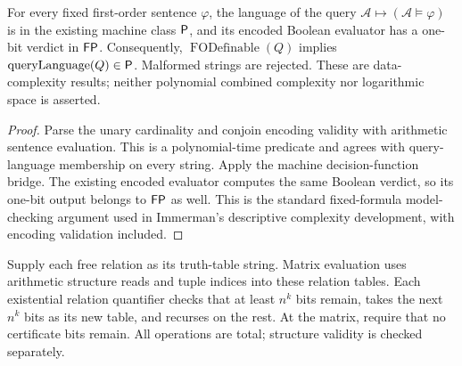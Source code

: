 \begin{theorem}
  \label{thm:desc-fo-in-P}
  \leanok
  For every fixed first-order sentence $\varphi$, the language of the query
  $\mathcal{A} \mapsto (\mathcal{A} \models \varphi)$ is in the existing machine
  class $\mathsf{P}$, and its encoded Boolean evaluator has a one-bit verdict in
  $\mathsf{FP}$. Consequently, $\operatorname{FODefinable}(Q)$ implies
  $\operatorname{queryLanguage}(Q)\in\mathsf{P}$. Malformed strings are rejected.
  These are data-complexity results; neither polynomial combined complexity
  nor logarithmic space is asserted.
\end{theorem}
\begin{proof}
  \leanok
  Parse the unary cardinality and conjoin encoding validity with arithmetic
  sentence evaluation. This is a polynomial-time predicate and agrees with
  query-language membership on every string. Apply the machine decision-function
  bridge. The existing encoded evaluator computes the same Boolean verdict, so
  its one-bit output belongs to $\mathsf{FP}$ as well. This is the standard
  fixed-formula model-checking argument used in Immerman's descriptive complexity
  development, with encoding validation included.
\end{proof}

\begin{definition}
  \label{def:desc-so-verifier-code}
  \leanok
  Supply each free relation as its truth-table string. Matrix evaluation uses
  arithmetic structure reads and tuple indices into these relation tables.
  Each existential relation quantifier checks that at least $n^k$ bits remain,
  takes the next $n^k$ bits as its new table, and recurses on the rest. At the
  matrix, require that no certificate bits remain. All operations are total;
  structure validity is checked separately.
\end{definition}

